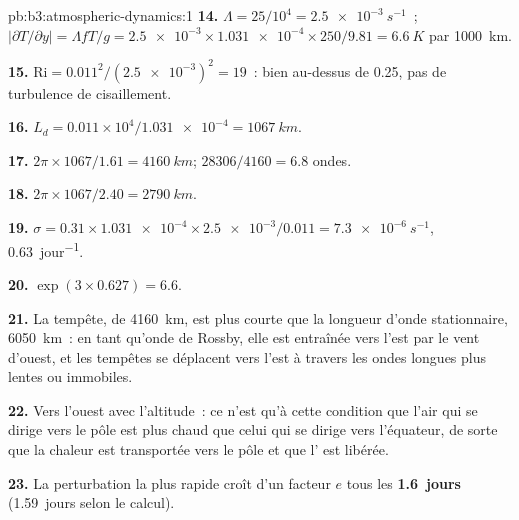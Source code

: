 \begin{solution}{pb:b3:atmospheric-dynamics:1}
\textbf{14.} $\Lambda = 25/10^4 = \qty{2.5e-3}{s^{-1}}$~;
$|\partial T/\partial y| = \Lambda fT/g = \num{2.5e-3}\times\num{1.031e-4}
\times250/9.81 = \qty{6.6}{K}$ par \qty{1000}{km}.

\textbf{15.} $\mathrm{Ri} = 0.011^2/(\num{2.5e-3})^2 = 19$~: bien au-dessus de 0.25,
pas de turbulence de cisaillement.

\textbf{16.} $L_d = 0.011\times10^4/\num{1.031e-4} = \qty{1067}{km}$.

\textbf{17.} $2\pi\times1067/1.61 = \qty{4160}{km}$; $28306/4160 = 6.8$
ondes.

\textbf{18.} $2\pi\times1067/2.40 = \qty{2790}{km}$.

\textbf{19.} $\sigma = 0.31\times\num{1.031e-4}\times\num{2.5e-3}/0.011 =
\qty{7.3e-6}{s^{-1}}$, \qty{0.63}{jour^{-1}}.

\textbf{20.} $\exp(3\times0.627) = 6.6$.

\textbf{21.} La tempête, de \qty{4160}{km}, est plus courte que la longueur
d'onde stationnaire, \qty{6050}{km}~: en tant qu'onde de Rossby, elle est
entraînée vers l'est par le vent d'ouest, et les tempêtes se déplacent vers
l'est à travers les ondes longues plus lentes ou immobiles.

\textbf{22.} Vers l'ouest avec l'altitude~: ce n'est qu'à cette condition que
l'air qui se dirige vers le pôle est plus chaud que celui qui se dirige vers l'équateur, de
sorte que la chaleur est transportée vers le pôle et que l' est libérée.

\textbf{23.} La perturbation la plus rapide croît d'un facteur $e$ tous les
\textbf{\qty[text-series-to-math=true]{1.6}{jours}} (\num{1.59}~jours selon
le calcul).
\end{solution}
